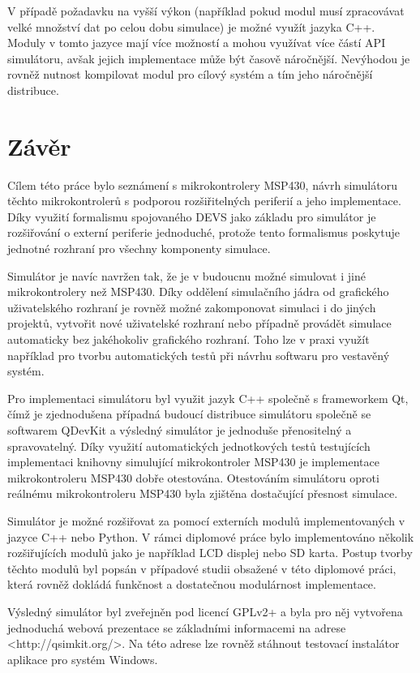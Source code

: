 V případě požadavku na vyšší výkon (například pokud modul musí zpracovávat velké množství dat po celou dobu simulace) je možné využít jazyka C++. Moduly v tomto jazyce mají více možností a mohou využívat více částí API simulátoru, avšak jejich implementace může být časově náročnější. Nevýhodou je rovněž nutnost kompilovat modul pro cílový systém a tím jeho náročnější distribuce.


\chapter{Závěr}

Cílem této práce bylo seznámení s mikrokontrolery MSP430, návrh simulátoru těchto mikrokontrolerů s podporou rozšiřitelných periferií a jeho implementace. Díky využití formalismu spojovaného DEVS jako základu pro simulátor je rozšiřování o externí periferie jednoduché, protože tento formalismus poskytuje jednotné rozhraní pro všechny komponenty simulace.

Simulátor je navíc navržen tak, že je v budoucnu možné simulovat i jiné mikrokontrolery než MSP430. Díky oddělení simulačního jádra od grafického uživatelského rozhraní je rovněž možné zakomponovat simulaci i do jiných projektů, vytvořit nové uživatelské rozhraní nebo případně provádět simulace automaticky bez jakéhokoliv grafického rozhraní. Toho lze v praxi využít například pro tvorbu automatických testů při návrhu softwaru pro vestavěný systém.

Pro implementaci simulátoru byl využit jazyk C++ společně s frameworkem Qt, čímž je zjednodušena případná budoucí distribuce simulátoru společně se softwarem QDevKit a výsledný simulátor je jednoduše přenositelný a spravovatelný. Díky využití automatických jednotkových testů testujících implementaci knihovny simulující mikrokontroler MSP430 je implementace mikrokontroleru MSP430 dobře otestována. Otestováním simulátoru oproti reálnému mikrokontroleru MSP430 byla zjištěna dostačující přesnost simulace.

Simulátor je možné rozšiřovat za pomocí externích modulů implementovaných v jazyce C++ nebo Python. V rámci diplomové práce bylo implementováno několik rozšiřujících modulů jako je například LCD displej nebo SD karta. Postup tvorby těchto modulů byl popsán v případové studii obsažené v této diplomové práci, která rovněž dokládá funkčnost a dostatečnou modulárnost implementace.

Výsledný simulátor byl zveřejněn pod licencí GPLv2+ a byla pro něj vytvořena jednoduchá webová prezentace se základními informacemi na adrese <http://qsimkit.org/>. Na této adrese lze rovněž stáhnout testovací instalátor aplikace pro systém Windows.

